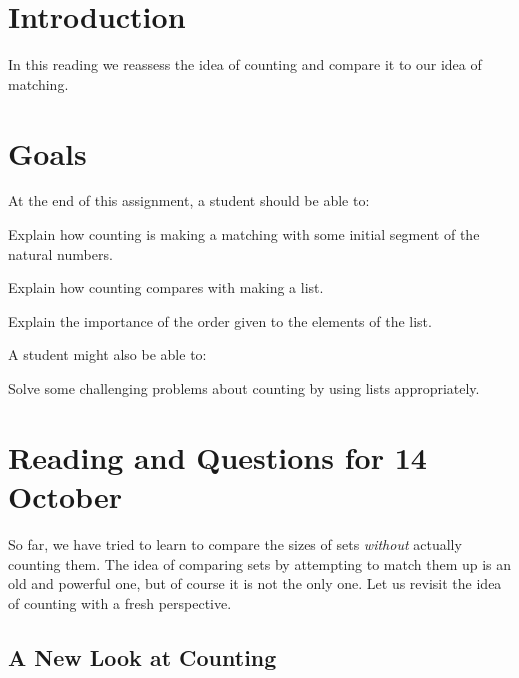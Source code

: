 \documentclass[12pt,letterpaper]{article}
\theoremstyle{definition}
\begin{document}
\setlength{\parskip}{1ex plus 0.5ex minus 0.2ex}
\setlength{\parindent}{0pt}

\pagestyle{fancy}
\cfoot{}

\section*{Introduction}
In this reading we reassess the idea of counting and compare it to our idea of matching.

\section*{Goals}
At the end of this assignment, a student should be able to:
\begin{compactitem}
\item Explain how counting is making a matching with some initial segment of the natural numbers.
\item Explain how counting compares with making a list.
\item Explain the importance of the order given to the elements of the list.
\end{compactitem}
A student might also be able to:
\begin{compactitem}
\item Solve some challenging problems about counting by using lists appropriately.
\end{compactitem}

\section*{Reading and Questions for 14 October}

So far, we have tried to learn to compare the sizes of sets \emph{without} actually counting them.
The idea of comparing sets by attempting to match them up is an old and powerful one, but of course it is not the only one.
Let us revisit the idea of counting with a fresh perspective.

\subsection*{A New Look at Counting}
\end{document}
